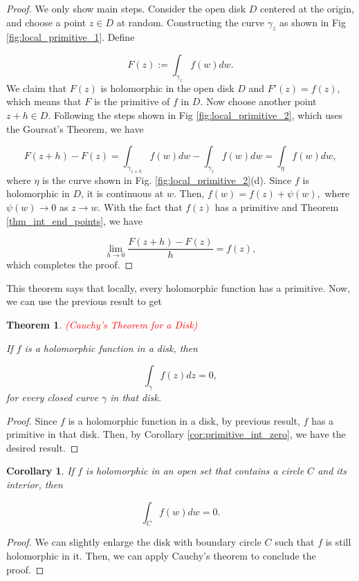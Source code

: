 \documentclass{article}
\newtheorem{theorem}{Theorem}
\newtheorem{corollary}{Corollary}
\begin{document}
\begin{proof}
We only show main steps. Consider the open disk $D$ centered at the origin, and choose a point $z\in D$ at random. Constructing the curve $\gamma_z$ as shown in Fig \ref{fig:local_primitive_1}. Define

\begin{equation*}
F(z):=\int_{\gamma_z}f(w)dw.
\end{equation*}
We claim that $F(z)$ is holomorphic in the open disk $D$ and $F'(z)=f(z)$, which means that $F$ is the primitive of $f$ in $D$. Now choose another point $z+h\in D$. Following the steps shown in Fig \ref{fig:local_primitive_2}, which uses the Goursat's Theorem, we have

\begin{equation*}
F(z+h)-F(z)=\int_{\gamma_{z+h}}f(w)dw-\int_{\gamma_{z}}f(w)dw=\int_\eta f(w)dw,
\end{equation*}
where $\eta$ is the curve shown in Fig. \ref{fig:local_primitive_2}(d). Since $f$ is holomorphic in $D$, it is continuous at $w$. Then, $f(w)=f(z)+\psi(w),$ where $\psi(w)\rightarrow0$ as $z\rightarrow w$. With the fact that $f(z)$ has a primitive and Theorem \ref{thm_int_end_points}, we have

\begin{equation*}
\lim_{h\rightarrow0}\frac{F(z+h)-F(z)}{h}=f(z),
\end{equation*}
which completes the proof.
\end{proof}

This theorem says that locally, every holomorphic function has a primitive. Now, we can use the previous result to get 

\begin{theorem} \textcolor{red}{(Cauchy's Theorem for a Disk)}

If $f$ is a holomorphic function in a disk, then 

\begin{equation}
\int_\gamma f(z)dz=0,
\end{equation}
for every closed curve $\gamma$ in that disk.

\end{theorem}

\begin{proof}
Since $f$ is a holomorphic function in a disk, by previous result, $f$ has a primitive in that disk. Then, by Corollary \ref{cor:primitive_int_zero}, we have the desired result.
\end{proof}

\begin{corollary}
If $f$ is holomorphic in an open set that contains a circle $C$ and its interior, then

\begin{equation*}
\int_C f(w)dw=0.
\end{equation*}
\end{corollary}

\begin{proof}
We can slightly enlarge the disk with boundary circle $C$ such that $f$ is still holomorphic in it. Then, we can apply Cauchy's theorem to conclude the proof. 
\end{proof}
\end{document}
